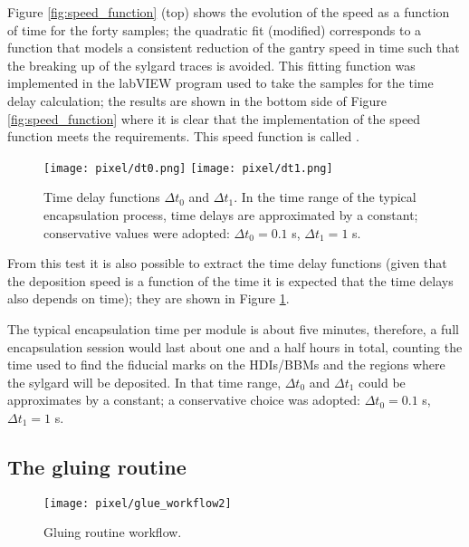 Figure \ref{fig:speed_function} (top) shows the evolution of the speed as a function of time for the forty samples; the quadratic fit (modified) corresponds to a function that models a consistent reduction of the gantry speed in time such that the breaking up of the sylgard traces is avoided. This fitting function was implemented in the labVIEW program used to take the samples for the time delay calculation; the results are shown in the bottom side of Figure \ref{fig:speed_function} where it is clear that the implementation of the speed function meets the requirements. This speed function is called .

\begin{figure}[h]
  \begin{center}
    \texttt{[image: pixel/dt0.png]} 
    \texttt{[image: pixel/dt1.png]}
    \caption[Time delay functions.]{Time delay functions $\Delta t_0$ and $\Delta t_1$. In the time range of the typical encapsulation process, time delays are approximated by a constant; conservative values were adopted:  $\Delta t_0 =0.1$ s,  $\Delta t_1 = 1$ s.}\label{fig:time_delay_functions}
  \end{center}
\end{figure}

From this test it is also possible to extract the time delay functions (given that the deposition speed is a function of the time it is expected that the time delays also depends on time); they are shown in Figure \ref{fig:time_delay_functions}.

The typical encapsulation time per module is about five minutes, therefore, a full encapsulation session would last about one and a half hours in total, counting the time used to find the fiducial marks on the HDIs/BBMs and the regions where the sylgard will be deposited. In that time range, $\Delta t_0$ and $\Delta t_1$ could be approximates by a constant; a conservative choice was adopted: $\Delta t_0 =0.1$ s,  $\Delta t_1 = 1$ s.            

\subsection{The gluing routine}

\begin{figure}[h]
  \begin{center}
    \texttt{[image: pixel/glue\_workflow2]}
    \caption[Gluing routine workflow.]{Gluing routine workflow.}\label{fig:glue_workflow}
  \end{center}
\end{figure}

